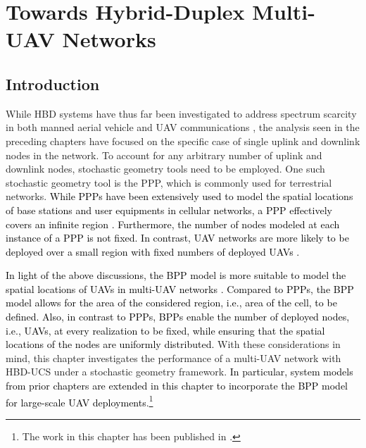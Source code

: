 \chapter{Towards Hybrid-Duplex Multi-UAV Networks}
\label{chap:HBD_multi_UAV}
\renewcommand{\theobservation}{\thesection.\arabic{observation}}

\section{Introduction}

While HBD systems have thus far been investigated to address spectrum scarcity in both manned aerial vehicle and UAV communications \cite{tan2018joint,ernest2019outage}, the analysis seen in the preceding chapters have focused on the specific case of single uplink and downlink nodes in the network. To account for any arbitrary number of uplink and downlink nodes, stochastic geometry tools need to be employed. One such stochastic geometry tool is the PPP, which is commonly used for terrestrial networks. \textcolor{black}{While PPPs have been extensively used to model the spatial locations of base stations and user equipments in cellular networks, a PPP effectively covers an infinite region \cite{chetlur2017downlink}. Furthermore, the number of nodes modeled at each instance of a PPP is not fixed. In contrast, UAV networks are more likely to be deployed over a small region with fixed numbers of deployed UAVs \cite{chetlur2017downlink,wang2018modeling}.} 

\textcolor{black}{In light of the above discussions, the BPP model is more suitable to model the spatial locations of UAVs in multi-UAV networks \cite{chetlur2017downlink,wang2018modeling}. Compared to PPPs, the BPP model allows for the area of the considered region, i.e., area of the cell, to be defined. Also, in contrast to PPPs, BPPs enable the number of deployed nodes, i.e., UAVs, at every realization to be fixed, while ensuring that the spatial locations of the nodes are uniformly distributed.} With these considerations in mind, this chapter investigates the performance of a multi-UAV network with HBD-UCS under a stochastic geometry framework.  \textcolor{black}{In particular, system models from prior chapters are extended in this chapter to incorporate the BPP model for large-scale UAV deployments}.\footnote{The work in this chapter has been published in \cite{ernest2019hybrid}.}

